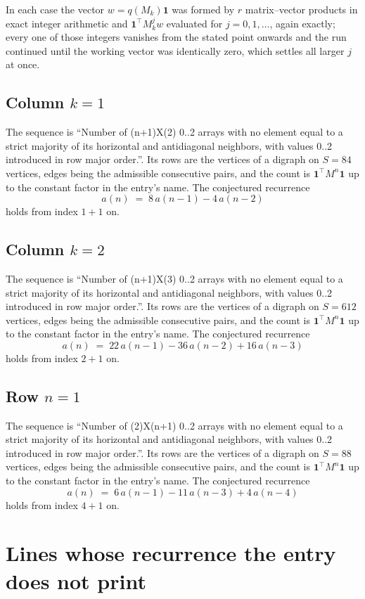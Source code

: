 \documentclass[11pt,a4paper]{article}
\theoremstyle{plain}
\theoremstyle{definition}
\begin{document}
In each case the vector $w=q(M_k)\mathbf{1}$ was formed by $r$ matrix--vector products in
exact integer arithmetic and $\mathbf{1}^{\!\top}M_k^{j}w$ evaluated for $j=0,1,\dots$,
again exactly; every one of those integers vanishes from the stated point onwards and the run
continued until the working vector was identically zero, which settles all larger $j$ at once.

\subsection*{Column $k$$=1$}
The sequence is ``Number of (n+1)X(2) 0..2 arrays with no element equal to a strict majority of its horizontal and antidiagonal neighbors, with values 0..2 introduced in row major order.''. Its rows are the vertices of a digraph on
$S=84$ vertices, edges being the admissible consecutive pairs, and the count is
$\mathbf{1}^{\!\top}M^{n}\mathbf{1}$ up to the constant factor in the entry's name.
The conjectured recurrence
\[
a(n)\;=\;8\,a(n-1) - 4\,a(n-2)
\]
holds from index $1+1$ on.

\subsection*{Column $k$$=2$}
The sequence is ``Number of (n+1)X(3) 0..2 arrays with no element equal to a strict majority of its horizontal and antidiagonal neighbors, with values 0..2 introduced in row major order.''. Its rows are the vertices of a digraph on
$S=612$ vertices, edges being the admissible consecutive pairs, and the count is
$\mathbf{1}^{\!\top}M^{n}\mathbf{1}$ up to the constant factor in the entry's name.
The conjectured recurrence
\[
a(n)\;=\;22\,a(n-1) - 36\,a(n-2) + 16\,a(n-3)
\]
holds from index $2+1$ on.

\subsection*{Row $n$$=1$}
The sequence is ``Number of (2)X(n+1) 0..2 arrays with no element equal to a strict majority of its horizontal and antidiagonal neighbors, with values 0..2 introduced in row major order.''. Its rows are the vertices of a digraph on
$S=88$ vertices, edges being the admissible consecutive pairs, and the count is
$\mathbf{1}^{\!\top}M^{n}\mathbf{1}$ up to the constant factor in the entry's name.
The conjectured recurrence
\[
a(n)\;=\;6\,a(n-1) - 11\,a(n-3) + 4\,a(n-4)
\]
holds from index $4+1$ on.


\section{Lines whose recurrence the entry does not print}
\end{document}
